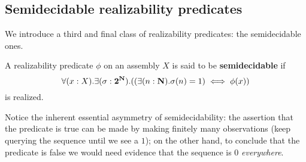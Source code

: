 
\subsection{Semidecidable realizability predicates}\label{sec:semidecidable-realizability-predicates}

We introduce a third and final class of realizability predicates: the
semidecidable ones.
\begin{definition}[Semidecidability]
  A realizability predicate \(\phi\) on an assembly \(X\) is said to be
  \textbf{semidecidable} if
  \[
    \forall(x : X).\exists(\sigma:\Two^\NatAsm).
    \pa*{\pa*{\exists(n : \NatAsm).\sigma(n) = 1}\iff\phi(x)}
  \]
  is realized.
\end{definition}

Notice the inherent essential asymmetry of semidecidability: the assertion that
the predicate is true can be made by making finitely many observations (keep
querying the sequence until we see a \(1\)); on the other hand, to conclude that
the predicate is false we would need evidence that the sequence is \(0\)
\emph{everywhere}.

